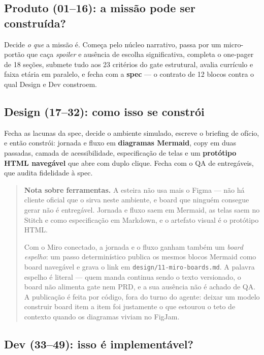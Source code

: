 \documentclass[11pt,a4paper]{article}
\begin{document}
\subsection{Produto (01--16): a missão pode ser construída?}

Decide \emph{o que} a missão é. Começa pelo núcleo narrativo, passa por um micro-portão que
caça \emph{spoiler} e ausência de escolha significativa, completa o one-pager de 18 seções,
submete tudo aos 23 critérios do gate estrutural, avalia currículo e faixa etária em paralelo,
e fecha com a \textbf{spec} --- o contrato de 12 blocos contra o qual Design e Dev constroem.

\subsection{Design (17--32): como isso se constrói}

Fecha as lacunas da spec, decide o ambiente simulado, escreve o briefing de ofício, e então
constrói: jornada e fluxo em \textbf{diagramas Mermaid}, copy em duas passadas, camada de
acessibilidade, especificação de telas e um \textbf{protótipo HTML navegável} que abre com
duplo clique. Fecha com o QA de entregáveis, que audita fidelidade à spec.

\begin{quote}\small
\textbf{Nota sobre ferramentas.} A esteira não usa mais o Figma --- não há cliente oficial que o
sirva neste ambiente, e board que ninguém consegue gerar não é entregável. Jornada e fluxo
saem em Mermaid, as telas saem no Stitch e como especificação em Markdown, e o artefato visual
é o protótipo HTML.

Com o Miro conectado, a jornada e o fluxo ganham também um \emph{board espelho}: um passo
determinístico publica os mesmos blocos Mermaid como board navegável e grava o link em
\texttt{design/11-miro-boards.md}. A palavra espelho é literal --- quem manda continua sendo o
texto versionado, o board não alimenta gate nem PRD, e a sua ausência não é achado de QA. A
publicação é feita por código, fora do turno do agente: deixar um modelo construir board item a
item foi justamente o que estourou o teto de contexto quando os diagramas viviam no FigJam.
\end{quote}

\subsection{Dev (33--49): isso é implementável?}
\end{document}
